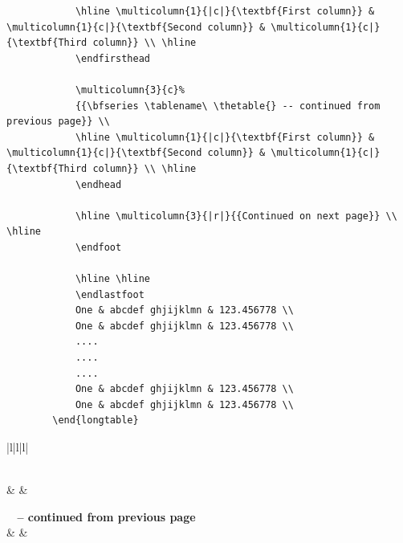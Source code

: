 \begin{spacing}{1.5}
{\begin{verbatim}
			\hline \multicolumn{1}{|c|}{\textbf{First column}} & \multicolumn{1}{c|}{\textbf{Second column}} & \multicolumn{1}{c|}{\textbf{Third column}} \\ \hline 
			\endfirsthead
			
			\multicolumn{3}{c}%
			{{\bfseries \tablename\ \thetable{} -- continued from previous page}} \\
			\hline \multicolumn{1}{|c|}{\textbf{First column}} & \multicolumn{1}{c|}{\textbf{Second column}} & \multicolumn{1}{c|}{\textbf{Third column}} \\ \hline 
			\endhead
			
			\hline \multicolumn{3}{|r|}{{Continued on next page}} \\ \hline
			\endfoot
			
			\hline \hline
			\endlastfoot
			One & abcdef ghjijklmn & 123.456778 \\
			One & abcdef ghjijklmn & 123.456778 \\
			....
			....
			....
			One & abcdef ghjijklmn & 123.456778 \\
			One & abcdef ghjijklmn & 123.456778 \\
		\end{longtable}
	\end{verbatim}
}

\begin{longtable}{|l|l|l|}
	\caption{This table can be used if more than one page table content is required. However it is limited to maximum of two pages only.} \label{tab:long} \\
	
	\hline {} &  &  \\ \hline 
	\endfirsthead
	
	{{\bfseries \tablename\ \thetable{} -- continued from previous page}} \\
	\hline {} &  &  \\ \hline 
	\endhead
	
	\hline {} \\ \hline
	\endfoot
	
	\hline \hline
	\endlastfoot
	

\end{longtable}
\end{spacing}
